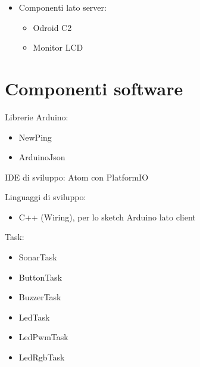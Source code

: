 \begin{itemize}
	\item Componenti lato server:
		\begin{itemize}
		\item Odroid C2
		\item Monitor LCD
	\end{itemize}
\end{itemize}

\section{Componenti software}
Librerie Arduino:
\begin{itemize}
	\item NewPing
	\item ArduinoJson
\end{itemize}

IDE di sviluppo: Atom con PlatformIO

Linguaggi di sviluppo:
\begin{itemize}
	\item C++ (Wiring), per lo sketch Arduino lato client 
\end{itemize}

Task:
\begin{itemize}
	\item SonarTask
	\item ButtonTask
	\item BuzzerTask
	\item LedTask
	\item LedPwmTask
	\item LedRgbTask
\end{itemize}